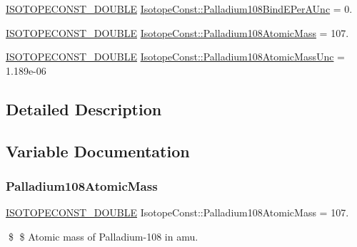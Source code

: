 \begin{DoxyCompactItemize}
\mbox{\hyperlink{group___isotope_const-_macros_ga8f45a7272ce02c0b4c65c44636ed719a}{I\+S\+O\+T\+O\+P\+E\+C\+O\+N\+S\+T\+\_\+\+D\+O\+U\+B\+LE}} \mbox{\hyperlink{group___isotope_const-_palladium-_pd108_ga11fe929f78c1579c6b0b8d8ea345a1b2}{Isotope\+Const\+::\+Palladium108\+Bind\+E\+Per\+A\+Unc}} = 0.
\item 
\mbox{\hyperlink{group___isotope_const-_macros_ga8f45a7272ce02c0b4c65c44636ed719a}{I\+S\+O\+T\+O\+P\+E\+C\+O\+N\+S\+T\+\_\+\+D\+O\+U\+B\+LE}} \mbox{\hyperlink{group___isotope_const-_palladium-_pd108_ga177a97a1db9f6fb200baa6703074d825}{Isotope\+Const\+::\+Palladium108\+Atomic\+Mass}} = 107.
\item 
\mbox{\hyperlink{group___isotope_const-_macros_ga8f45a7272ce02c0b4c65c44636ed719a}{I\+S\+O\+T\+O\+P\+E\+C\+O\+N\+S\+T\+\_\+\+D\+O\+U\+B\+LE}} \mbox{\hyperlink{group___isotope_const-_palladium-_pd108_ga97bcbec7536320245a809cad99ad3fb3}{Isotope\+Const\+::\+Palladium108\+Atomic\+Mass\+Unc}} = 1.\+189e-\/06
\end{DoxyCompactItemize}


\subsection{Detailed Description}


\subsection{Variable Documentation}
\mbox{\label{group___isotope_const-_palladium-_pd108_ga177a97a1db9f6fb200baa6703074d825}} 
\subsubsection{\texorpdfstring{Palladium108\+Atomic\+Mass}{Palladium108AtomicMass}}
{\footnotesize\ttfamily \mbox{\hyperlink{group___isotope_const-_macros_ga8f45a7272ce02c0b4c65c44636ed719a}{I\+S\+O\+T\+O\+P\+E\+C\+O\+N\+S\+T\+\_\+\+D\+O\+U\+B\+LE}} Isotope\+Const\+::\+Palladium108\+Atomic\+Mass = 107.}

\$ \$ Atomic mass of Palladium-\/108 in amu. \mbox{\label{group___isotope_const-_palladium-_pd108_ga97bcbec7536320245a809cad99ad3fb3}} 
